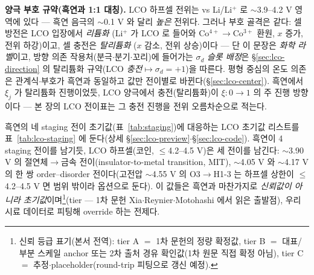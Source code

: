 \textbf{양극 부호 규약(흑연과 1:1 대칭).} LCO 하프셀 전위는 vs Li/Li$^+$ 로 $\sim$3.9--4.2 V 영역에 있다 --- 흑연 음극의
$\sim$0.1 V 와 달리 \emph{높은} 전위다. 그러나 부호 골격은 같다: 셀 방전은 LCO 입장에서 \emph{리튬화}
(Li$^+$ 가 LCO 로 들어와 Co$^{4+}\!\to$Co$^{3+}$ 환원, $x$ 증가, 전위 하강)이고, 셀 충전은 \emph{탈리튬화}
($x$ 감소, 전위 상승)이다 --- 단 이 문장은 \emph{화학 라벨}이고, 방향 의존 작용처(분극$\cdot$분기$\cdot$꼬리)에 들어가는
$\sigma_d$ \emph{슬롯 배정}은 \S\ref{sec:lco-direction} 의 탈리튬화 규약(LCO \emph{충전}$\mapsto\sigma_d{=}+1$)을
따른다. 평형 중심의 온도 의존은 관계식$\cdot$부호가 흑연과 동일하고 값만 전이별로 바뀐다(\S\ref{sec:lco-center}).
흑연에서 $\xi_j$ 가 탈리튬화 진행이었듯, LCO 양극에서 충전(탈리튬화)이 $\xi:0\!\to\!1$ 의 주 진행 방향이다 --- 본 장의
LCO 전이표는 그 충전 진행을 전위 오름차순으로 적는다.

흑연의 네 staging 전이 초기값(표~\ref{tab:staging})에 대응하는 LCO 초기값 리스트를 표~\ref{tab:lco-staging}
에 둔다(상세 \S\ref{sec:lco-preview}$\cdot$\S\ref{sec:lco-code}). 흑연이 4 staging 전이를 남기듯, LCO
하프셀(코인, $\le$4.2--4.5 V)은 세 전이를 남긴다\cite{xia2007}: $\sim$3.90 V 의 절연체$\to$금속 전이(insulator-to-metal transition, MIT), $\sim$4.05 V 와
$\sim$4.17 V 의 한 쌍 order--disorder 전이다(고전압 $\sim$4.55 V 의 O3$\to$H1-3 는 하프셀 상한이 $\le$4.2--4.5 V 면
범위 밖이라 옵션으로 둔다). 이 값들은 흑연과 마찬가지로 \emph{신뢰값이 아니라 초기값}이며\footnote{신뢰
등급 표기(본서 전역): tier A $=$ 1차 문헌의 정량 확정값, tier B $=$ 대표/부분 스케일 anchor 또는
2차 출처 경유 확인값(1차 원문 직접 확정 아님), tier C $=$ 추정$\cdot$placeholder(round-trip 피팅으로
갱신 예정).}(tier --- 1차 문헌
Xia\cite{xia2007}$\cdot$Reynier\cite{reynier2004}$\cdot$Motohashi\cite{motohashi2009} 에서 읽은 출발점), 우리 시료 데이터로
피팅해 override 하는 전제다.

